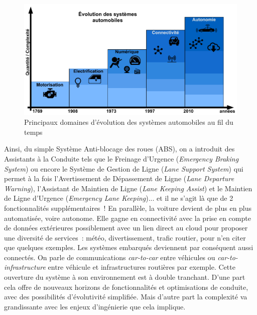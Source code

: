 \documentclass[french, a4paper, 11pt, twoside, pdftex]{StyleThese}
\begin{document}
		\begin{figure}[ht]
			\centering
			\includegraphics[width=0.9\linewidth]{schemas/Evo_Sys_Automobile}
			\caption[Évolutions des Systèmes Automobiles]{Principaux domaines d'évolution des systèmes automobiles au fil du temps}
			\label{fig:evo_sys_automobile}
		\end{figure}

		Ainsi, du simple Système Anti-blocage des roues (ABS), on a introduit des Assistants à la Conduite tels que le Freinage d'Urgence (\textit{Emergency Braking System}) ou encore le Système de Gestion de Ligne (\textit{Lane Support System}) qui permet à la fois l'Avertissement de Dépassement de Ligne (\textit{Lane Departure Warning}), l'Assistant de Maintien de Ligne (\textit{Lane Keeping Assist}) et le Maintien de Ligne d'Urgence (\textit{Emergency Lane Keeping})... et il ne s'agit là que de 2 fonctionnalités supplémentaires~! En parallèle, la voiture devient de plus en plus automatisée, voire autonome. Elle gagne en connectivité avec la prise en compte de données extérieures possiblement avec un lien direct au cloud pour proposer une diversité de services~: météo, divertissement, trafic routier, pour n'en citer que quelques exemples.
		Les systèmes embarqués deviennent par conséquent aussi connectés. On parle de communications \emph{car-to-car} entre véhicules ou \emph{car-to-infrastructure} entre véhicule et infrastructures routières par exemple. 
		Cette ouverture du système à son environnement est à double tranchant. D'une part cela offre de nouveaux horizons de fonctionnalités et optimisations de conduite, avec des possibilités d'évolutivité simplifiée. Mais d'autre part la complexité va grandissante avec les enjeux d'ingénierie que cela implique. %
		 
\end{document}
